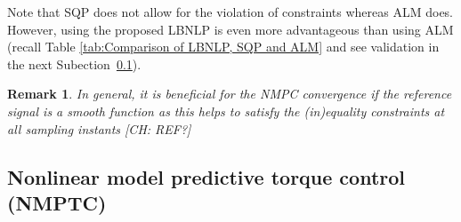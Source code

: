 \documentclass[journal]{IEEEtranTIE}
\newtheorem{remark}{Remark}
\newcommand{\CHHA}[1]{{\color{red} [CH: #1]}} %
\begin{document}
Note that SQP does not allow for the violation of constraints whereas ALM does. However, using the proposed LBNLP is even more advantageous than using ALM (recall Table \ref{tab:Comparison of LBNLP, SQP and ALM} and see validation in the next Subection~\ref{subsec:NMPTC}).

\begin{remark}
In general, it is beneficial for the NMPC convergence if the reference signal is a smooth function as this helps to satisfy the (in)equality constraints at all sampling instants \CHHA{REF?}
\end{remark}

\subsection{Nonlinear model predictive torque control (NMPTC)}
\label{subsec:NMPTC}
\end{document}
